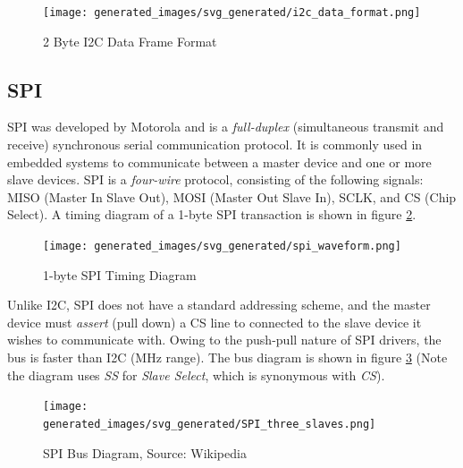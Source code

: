 \documentclass[main.tex]{subfiles}
\begin{document}
\begin{figure}[H]
    \centering
    \texttt{[image: generated\_images/svg\_generated/i2c\_data\_format.png]}
    \caption{2 Byte I2C Data Frame Format}
    \label{fig:i2c_data_format}
\end{figure}

\subsection{SPI}
SPI was developed by Motorola \cite{SPI_history} and is a \textit{full-duplex} (simultaneous transmit and receive) synchronous serial communication protocol. It is commonly used in embedded systems to communicate between a master device and one or more slave devices. SPI is a \textit{four-wire} protocol, consisting of the following signals: MISO (Master In Slave Out), MOSI (Master Out Slave In), SCLK, and CS (Chip Select). A timing diagram of a 1-byte SPI transaction is shown in figure \ref{fig:spi_timing}.

\begin{figure}[H]
    \centering
    \texttt{[image: generated\_images/svg\_generated/spi\_waveform.png]}
    \caption{1-byte SPI Timing Diagram}
    \label{fig:spi_timing}
\end{figure}

\noindent Unlike I2C, SPI does not have a standard addressing scheme, and the master device must \textit{assert} (pull down) a CS line to connected to the slave device it wishes to communicate with. Owing to the push-pull nature of SPI drivers, the bus is faster than I2C (MHz range). The bus diagram is shown in figure \ref{fig:spi_bus} (Note the diagram uses \textit{SS} for \textit{Slave Select}, which is synonymous with \textit{CS}).

\begin{figure}[H]
    \centering
    \texttt{[image: generated\_images/svg\_generated/SPI\_three\_slaves.png]}
    \caption{SPI Bus Diagram, Source: Wikipedia \cite{wikipedia_SPI_bus}}
    \label{fig:spi_bus}
\end{figure}

\end{document}
